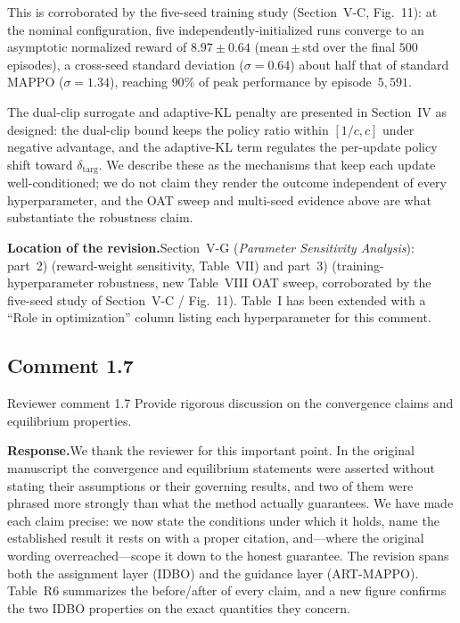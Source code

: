 \documentclass[11pt]{article}
\newcommand{\rsp}{\medskip\noindent\textbf{Response.}\quad}
\newcommand{\loc}{\medskip\noindent\textbf{Location of the revision.}\quad}
\begin{document}
\medskip\noindent This is corroborated by the five-seed training study (Section~V-C,
Fig.~11): at the nominal configuration, five independently-initialized runs converge to an
asymptotic normalized reward of $8.97\pm0.64$ (mean\,$\pm$\,std over the final $500$
episodes), a cross-seed standard deviation ($\sigma=0.64$) about half that of standard MAPPO
($\sigma=1.34$), reaching $90\%$ of peak performance by episode~$5{,}591$.

\medskip\noindent The dual-clip surrogate and adaptive-KL penalty are presented in
Section~IV as designed: the dual-clip bound keeps the policy ratio within
$[1/c,c]$ under negative advantage, and the adaptive-KL term regulates the per-update
policy shift toward $\delta_{\text{targ}}$. We describe these as the mechanisms that keep
each update well-conditioned; we do not claim they render the outcome independent of every
hyperparameter, and the OAT sweep and multi-seed evidence above are what substantiate the
robustness claim.

\loc Section~V-G (\emph{Parameter Sensitivity Analysis}): part~2) (reward-weight
sensitivity, Table~VII) and part~3) (training-hyperparameter robustness, new Table~VIII OAT
sweep, corroborated by the five-seed study of Section~V-C / Fig.~11). Table~I has been
extended with a ``Role in optimization'' column listing each hyperparameter for this comment.



\subsection*{Comment 1.7 }

\begin{reviewercomment}{Reviewer comment 1.7}
Provide rigorous discussion on the convergence claims and equilibrium properties.
\end{reviewercomment}

\rsp We thank the reviewer for this important point. In the original manuscript the
convergence and equilibrium statements were asserted without stating their assumptions or
their governing results, and two of them were phrased more strongly than what the method
actually guarantees. We have made each claim precise: we now state the conditions under
which it holds, name the established result it rests on with a proper citation, and---where
the original wording overreached---scope it down to the honest guarantee. The revision
spans both the assignment layer (IDBO) and the guidance layer (ART-MAPPO). Table~R6
summarizes the before/after of every claim, and a new figure confirms the two IDBO
properties on the exact quantities they concern.
\end{document}
